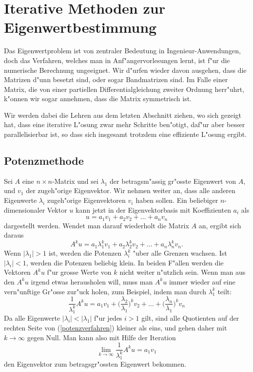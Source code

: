 
\section{Iterative Methoden zur Eigenwertbestimmung}
Das Eigenwertproblem ist von zentraler Bedeutung in Ingenieur-Anwendungen,
doch das Verfahren, welches man in Anf"angervorlesungen lernt, ist f"ur die
numerische Berechnung ungeeignet.
Wir d"urfen wieder davon ausgehen, dass die Matrizen d"unn besetzt sind, oder
sogar Bandmatrizen sind.
Im Falle einer Matrix, die von einer partiellen Differentialgleichung
zweiter Ordnung herr"uhrt, k"onnen wir sogar annehmen, dass die
Matrix symmetrisch ist.

Wir werden dabei die Lehren aus dem letzten Abschnitt ziehen, wo sich
gezeigt hat, dass eine iterative L"osung zwar mehr Schritte ben"otigt,
daf"ur aber besser parallelisierbar ist, so dass sich insgesamt trotzdem
eine effiziente L"osung ergibt.

\subsection{Potenzmethode}
Sei $A$ eine $n\times n$-Matrix und sei $\lambda_1$ der betragsm"assig
gr"osste Eigenwert von $A$, und $v_1$ der zugeh"orige Eigenvektor.
Wir nehmen weiter an, dass alle anderen Eigenwerte $\lambda_i$ zugeh"orige
Eigenvektoren $v_i$ haben sollen. Ein beliebiger $n$-dimensionaler Vektor $u$
kann jetzt in der Eigenvektorbasis mit Koeffizienten $a_i$ als
\[
u=
a_1v_1+a_2v_2+\dots+a_nv_n
\]
dargestellt werden.
Wendet man darauf wiederholt die Matrix $A$ an, ergibt sich daraus
\[
A^ku=
a_1\lambda_1^kv_1
+
a_2\lambda_2^kv_2
+
\dots
+
a_n\lambda_n^kv_n.
\]
Wenn $|\lambda_1| > 1$ ist, werden die Potenzen $\lambda_i^k$ "uber
alle Grenzen wachsen.
Ist $|\lambda_i|<1$, werden die Potenzen beliebig klein.
In beiden F"allen werden die Vektoren $A^ku$ f"ur grosse Werte von $k$
nicht weiter n"utzlich sein.
Wenn man aus den $A^ku$ irgend etwas herausholen will, muss man $A^ku$ 
immer wieder auf eine vern"unftige Gr"osse zur"uck holen, zum Beispiel,
indem man durch $\lambda_1^k$ teilt:
\begin{equation}
\frac1{\lambda_1^k}A^ku=a_1v_1
+\biggl(\frac{\lambda_2}{\lambda_1}\biggr)^kv_2
+\dots+
\biggl(\frac{\lambda_n}{\lambda_1}\biggr)^kv_n
\label{potenzverfahren}
\end{equation}
Da alle Eigenwerte $|\lambda_i|<|\lambda_1|$ f"ur jedes $i>1$ gilt,
sind alle Quotienten auf der rechten Seite von (\ref{potenzverfahren})
kleiner als eins, und gehen daher mit $k\to\infty$ gegen Null. Man kann
also mit Hilfe der Iteration
\[
\lim_{k\to\infty}\frac1{\lambda_1^k}A^ku=a_1v_1
\]
den Eigenvektor zum betragsgr"ossten Eigenwert bekommen.

